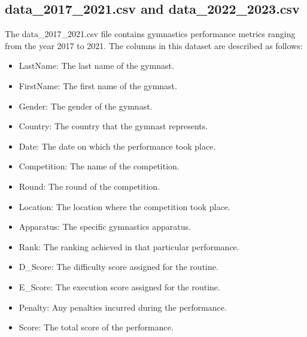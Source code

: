 \documentclass[11pt]{article}
\begin{document}
  \subsection{data\_2017\_2021.csv and data\_2022\_2023.csv}
        The data\_2017\_2021.csv   file contains gymnastics performance metrics ranging from the year 2017 to 2021. The columns in this dataset are described as follows:
        \begin{itemize}
            \item LastName: The last name of the gymnast.
            \item FirstName: The first name of the gymnast.
            \item Gender: The gender of the gymnast.
            \item Country: The country that the gymnast represents.
            \item Date: The date on which the performance took place.
            \item Competition: The name of the competition.
            \item Round: The round of the competition.
            \item Location: The location where the competition took place.
            \item Apparatus: The specific gymnastics apparatus.
            \item Rank: The ranking achieved in that particular performance.
            \item D\_Score: The difficulty score assigned for the routine.
            \item E\_Score: The execution score assigned for the routine.
            \item Penalty: Any penalties incurred during the performance.
            \item Score: The total score of the performance.
        \end{itemize}

        
\end{document}
